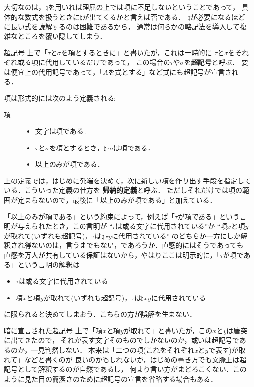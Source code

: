 \documentclass[a4j,10.5pt,oneside,openany]{jsbook}
\theoremstyle{mystyle}
\begin{document}
	大切なのは，$\natural$を用いれば理屈の上では項に不足しないということであって，
	具体的な数式を扱うときに$\natural$が出てくるかと言えば否である．
	$\natural$が必要になるほどに長い式を読解するのは困難であるから，
	通常は何らかの略記法を導入して複雑なところを覆い隠してしまう．
	
	\begin{itembox}[l]{超記号}
		上で「$\tau$と$\sigma$を項とするときに」と書いたが，これは一時的に
		$\tau$と$\sigma$をそれぞれ或る項に代用しているだけであって，
		この場合の$\tau$や$\sigma$を{\bf 超記号}と呼ぶ．
		要は便宜上の代用記号であって，「$A$を式とする」など式にも超記号が宣言される．
	\end{itembox}
	
	項は形式的には次のよう定義される:
	
	\begin{description}
		\item[項]
			\begin{itemize}
				\item 文字は項である．
				\item $\tau$と$\sigma$を項とするとき，$\natural \tau \sigma$は項である．
				\item 以上のみが項である．
			\end{itemize}
	\end{description}
	
	上の定義では，はじめに発端を決めて，次に新しい項を作り出す手段を指定している．こういった定義の仕方を
	{\bf 帰納的定義}と呼ぶ．
	ただしそれだけでは項の範囲が定まらないので，最後に「以上のみが項である」と加えている．
	
	「以上のみが項である」という約束によって，例えば「$\tau$が項である」という言明が与えられたとき，この言明が
	``$\tau$は或る文字に代用されている''か
	``項$x$と項$y$が取れて(いずれも超記号)，$\tau$は$\natural xy$に代用されている''
	のどちらか一方にしか解釈され得ないのは，言うまでもない，であろうか．直感的にはそうであっても
	直感を万人が共有している保証はないから，やはりここは明示的に，「$\tau$が項である」という言明の解釈は
	\begin{itemize}
		\item $\tau$は或る文字に代用されている
		\item 項$x$と項$y$が取れて(いずれも超記号)，$\tau$は$\natural xy$に代用されている
	\end{itemize}
	に限られると決めてしまおう．こちらの方が誤解を生まない．
	
	\begin{itembox}[l]{暗に宣言された超記号}
		上で「項$x$と項$y$が取れて」と書いたが，この$x$と$y$は唐突に出てきたので，
		それが表す文字そのものでしかないのか，或いは超記号であるのか，一見判然しない．
		本来は「二つの項(これをそれぞれ$x$と$y$で表す)が取れて」などと書くのが
		良いのかもしれないが，はじめの書き方でも文脈上は超記号として解釈するのが自然であるし，
		何より言い方がまどろこくない．このように見た目の簡潔さのために超記号の宣言を省略する場合もある．
	\end{itembox}
	
\end{document}
